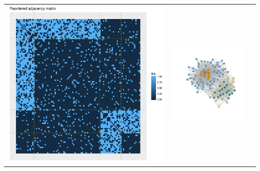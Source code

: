 \documentclass[compress,10pt]{beamer}
\begin{document}
\begin{frame}
\centering
\begin{tabular}{ccc}
 \includegraphics[scale=.2]{plots/sbm/Etoile_reordered_adja_with_groups.png}&
\includegraphics[scale=.2]{plots/sbm/Etoile_graphe_with_colors.png}&

\end{tabular}
\end{frame}
\end{document}
